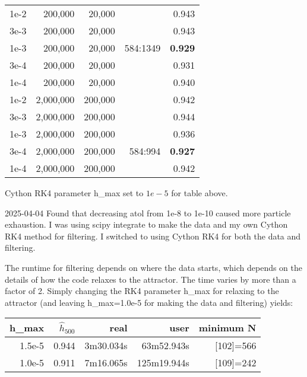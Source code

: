 \documentclass[12pt]{article}
\begin{document}
\begin{tabular*}{1.0\linewidth}{rrrrr}
  1e-2 & 200,000 & 20,000 && 0.943          \\
  3e-3 & 200,000 & 20,000 && 0.943          \\
  1e-3 & 200,000 & 20,000 & 584:1349& \textbf{0.929} \\
  3e-4 & 200,000 & 20,000 && 0.931          \\
  1e-4 & 200,000 & 20,000 && 0.940          \\ \hline
  1e-2 & 2,000,000 & 200,000 && 0.942          \\
  3e-3 & 2,000,000 & 200,000 && 0.944          \\
  1e-3 & 2,000,000 & 200,000 && 0.936          \\
  3e-4 & 2,000,000 & 200,000 & 584:994 & \textbf{0.927} \\
  1e-4 & 2,000,000 & 200,000 && 0.942          \\ \hline
\end{tabular*}
Cython RK4 parameter h\_max set to $1e-5$ for table above.

2025-04-04 Found that decreasing atol from 1e-8 to 1e-10 caused
more particle exhaustion.  I was using scipy integrate to make the
data and my own Cython RK4 method for filtering.  I switched to using
Cython RK4 for both the data and filtering.

The runtime for filtering depends on where the data starts, which
depends on the details of how the code relaxes to the attractor.  The
time varies by more than a factor of 2.  Simply changing the RK4
parameter h\_max for relaxing to the attractor (and leaving
h\_max=1.0e-5 for making the data and filtering) yields:\\
\begin{tabular*}{1.0\linewidth}{rrrrr}
  h\_max & $\hat h_{500}$ & real      & user        & minimum N\\ \hline
  1.5e-5 & 0.944         & 3m30.034s & 63m52.943s  & [102]=566 \\
  1.0e-5 & 0.911         & 7m16.065s & 125m19.944s & [109]=242
\end{tabular*}
\end{document}
